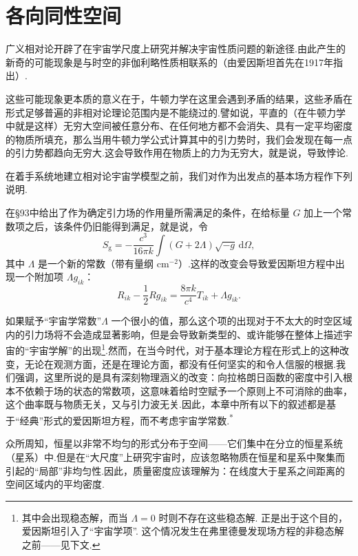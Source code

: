 \section{各向同性空间}

广义相对论开辟了在宇宙学尺度上研究并解决宇宙性质问题的新途径.由此产生的新奇的可能现象是与时空的非伽利略性质相联系的（由爱因斯坦首先在1917年指出）.

这些可能现象更本质的意义在于，牛顿力学在这里会遇到矛盾的结果，这些矛盾在形式足够普遍的非相对论理论范围内是不能绕过的.譬如说，平直的（在牛顿力学中就是这样）无穷大空间被任意分布、在任何地方都不会消失、具有一定平均密度的物质所填充，那么当用牛顿力学公式计算其中的引力势时，我们会发现在每一点的引力势都趋向无穷大.这会导致作用在物质上的力为无穷大，就是说，导致悖论.

在着手系统地建立相对论宇宙学模型之前，我们对作为出发点的基本场方程作下列说明.

在§93中给出了作为确定引力场的作用量所需满足的条件，在给标量 $G$ 加上一个常数项之后，该条件仍旧能得到满足，就是说，令
\begin{equation*}
  S_{\mathrm{g}}=-\frac{c^{3}}{16\pi k}\int(G+2\Lambda)\sqrt{-g}\,\mathrm{d}\varOmega,
\end{equation*}
其中 $\Lambda$ 是一个新的常数（带有量纲 $\mathrm{cm}^{-2}$）.这样的改变会导致爱因斯坦方程中出现一个附加项 $\Lambda g_{ik}$：
\begin{equation*}
  R_{ik}-\frac{1}{2}Rg_{ik}=\frac{8\pi k}{c^{4}}T_{ik}+\Lambda g_{ik}.
\end{equation*}

如果赋予“宇宙学常数”$\Lambda$ 一个很小的值，那么这个项的出现对于不太大的时空区域内的引力场将不会造成显著影响，但是会导致新类型的、或许能够在整体上描述宇宙的“宇宙学解”的出现\footnote{其中会出现稳态解，而当 $\Lambda=0$ 时则不存在这些稳态解. 正是出于这个目的，爱因斯坦引入了“宇宙学项”. 这个情况发生在弗里德曼发现场方程的非稳态解之前——见下文.}.然而，在当今时代，对于基本理论方程在形式上的这种改变，无论在观测方面，还是在理论方面，都没有任何坚实的和令人信服的根据.我们强调，这里所说的是具有深刻物理涵义的改变：向拉格朗日函数的密度中引入根本不依赖于场的状态的常数项，这意味着给时空赋予一个原则上不可消除的曲率，这个曲率既与物质无关，又与引力波无关.因此，本章中所有以下的叙述都是基于“经典”形式的爱因斯坦方程，而不考虑宇宙学常数.\textsuperscript{*}{\renewcommand{\thefootnote}{*}}

众所周知，恒星以非常不均匀的形式分布于空间——它们集中在分立的恒星系统（星系）中.但是在“大尺度”上研究宇宙时，应该忽略物质在恒星和星系中聚集而引起的“局部”非均匀性.因此，质量密度应该理解为：在线度大于星系之间距离的空间区域内的平均密度.

